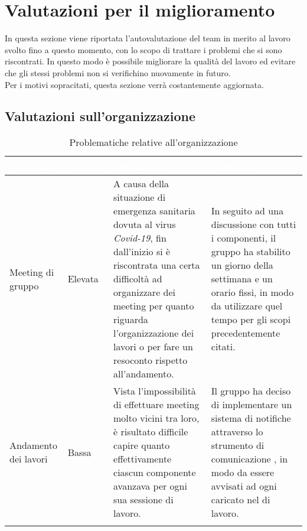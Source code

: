 \section{Valutazioni per il miglioramento}

In questa sezione viene riportata l'autovalutazione del team in merito al lavoro svolto fino a questo momento, con lo scopo di trattare i problemi che si sono riscontrati. In questo modo è possibile migliorare la qualità del lavoro ed evitare che gli stessi problemi non si verifichino nuovamente in futuro.\\Per i motivi sopracitati, questa sezione verrà costantemente aggiornata.

\subsection{Valutazioni sull'organizzazione}

\renewcommand{\arraystretch}{1.5}
\centering
\begin{longtable}{C{2.5cm} C{2.5cm} C{6cm} C{5cm}}
\textcolor{white}{\textbf{Problema}} &
\textcolor{white}{\textbf{Gravità}} &
\textcolor{white}{\textbf{Descrizione}} &	
\textcolor{white}{\textbf{Soluzione}} \\	
\endhead

Meeting di gruppo &
Elevata & 
A causa della situazione di emergenza sanitaria dovuta al virus \textit{Covid-19}, fin dall'inizio si è riscontrata una certa difficoltà ad organizzare dei meeting per quanto riguarda l'organizzazione dei lavori o per fare un resoconto rispetto all'andamento. &
In seguito ad una discussione con tutti i componenti, il gruppo ha stabilito un giorno della settimana e un orario fissi, in modo da utilizzare quel tempo per gli scopi precedentemente citati. \\

Andamento dei lavori &
Bassa & 
Vista l'impossibilità di effettuare meeting molto vicini tra loro, è risultato difficile capire quanto effettivamente ciascun componente avanzava per ogni sua sessione di lavoro. &
Il gruppo ha deciso di implementare un sistema di notifiche attraverso lo strumento di comunicazione , in modo da essere avvisati ad ogni  caricato nel  di lavoro. \\

 \caption{Problematiche relative all'organizzazione}
\end{longtable}



